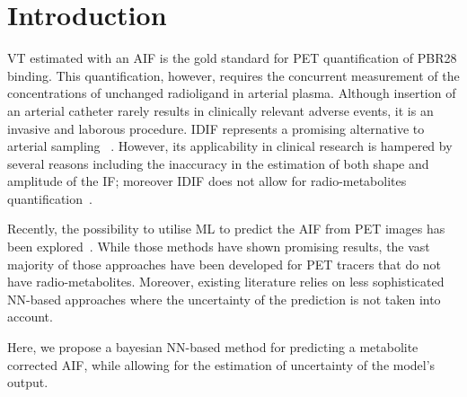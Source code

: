 \vspace{-0.6cm}

\section{Introduction} \label{sec:introduction}\vspace{-0.1cm}
     \gls{VT} estimated with an \gls{AIF} is the gold standard for \gls{PET} quantification of \gls{PBR28} binding. This quantification, however, requires the concurrent measurement of the concentrations of unchanged radioligand in arterial plasma. Although insertion of an arterial catheter rarely results in clinically relevant adverse events, it is an invasive and laborous procedure. 
    \gls{IDIF} represents a promising alternative to arterial sampling ~\cite{Zanotti-Fregonara2011}. However, its applicability in clinical research is hampered by several reasons including the    inaccuracy in the estimation of  both shape and amplitude of the \gls{IF}; moreover \gls{IDIF} does not allow for  radio-metabolites quantification~\cite{Sari2018Non-invasive11C-SB201745}. 
    
    Recently, the possibility to utilise \gls{ML} to predict the \gls{AIF} from \gls{PET} images has been explored~\cite{Kuttner2020, Ferrante2022PhysicallyImaging}. While those methods have shown promising results, the vast majority of those approaches have been developed for \gls{PET} tracers that do not have radio-metabolites. Moreover, existing literature relies on less sophisticated \gls{NN}-based approaches where the uncertainty of the prediction is not taken into account.
    
    Here, we propose a bayesian \gls{NN}-based method for predicting a metabolite corrected \gls{AIF}, while allowing for the estimation of uncertainty of the model's output.%
    
